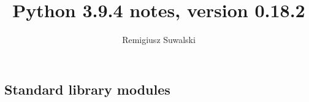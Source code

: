 \documentclass{charun}
\title{Python 3.9.4 notes, version 0.18.2}
\author{Remigiusz Suwalski}
\begin{document}
\begin{multicols*}{2}
\maketitle
\raggedright





\section{Standard library modules}
































\end{multicols*}
\end{document}
